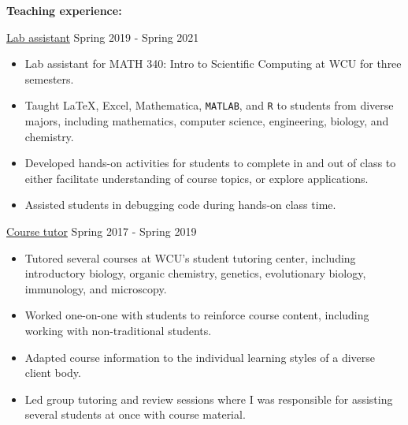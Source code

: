 \textbf{Teaching experience:}

\ul{Lab assistant} \hfill Spring 2019 - Spring 2021 
\begin{itemize}
\item Lab assistant for MATH 340: Intro to Scientific Computing at WCU for three semesters.
\item Taught \LaTeX{}, Excel, Mathematica, \texttt{MATLAB}, and \texttt{R} to students from diverse majors, including mathematics, computer science, engineering, biology, and chemistry.
\item Developed hands-on activities for students to complete in and out of class to either facilitate understanding of course topics, or explore applications.
\item Assisted students in debugging code during hands-on class time.
\end{itemize}

\ul{Course tutor} \hfill Spring 2017 - Spring 2019
\begin{itemize}
\item Tutored several courses at WCU's student tutoring center, including introductory biology, organic chemistry, genetics, evolutionary biology, immunology, and microscopy.
\item Worked one-on-one with students to reinforce course content, including working with non-traditional students.
\item Adapted course information to the individual learning styles of a diverse client body.
\item Led group tutoring and review sessions where I was responsible for assisting several students at once with course material.
\end{itemize}